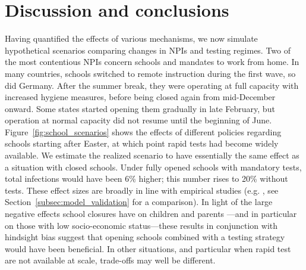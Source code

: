 \section{Discussion and conclusions}

Having quantified the effects of various mechanisms, we now simulate hypothetical
scenarios comparing changes in NPIs and testing regimes. Two of the most contentious
NPIs concern schools and mandates to work from home.\label{ref.2.a} In many countries,
schools switched to remote instruction during the first wave, so did Germany. After the
summer break, they were operating at full capacity with increased hygiene measures,
before being closed again from mid-December onward. Some states started opening them
gradually in late February, but operation at normal capacity did not resume until the
beginning of June. Figure~\ref{fig:school_scenarios} shows the effects of different
policies regarding schools starting after Easter, at which point rapid tests had become
widely available. We estimate the realized scenario to have essentially the same effect
as a situation with closed schools. Under fully opened schools with mandatory tests,
total infections would have been 6\% higher; this number rises to 20\% without tests.
These effect sizes are broadly in line with empirical studies (e.g. \citet{Vlachos2021,
    Berger2021}, see Section~\ref{subsec:model_validation} for a comparison). In light of
the large negative effects school closures have on children and parents
\citep{Luijten2021, Melegari2021}---and in particular on those with low socio-economic
status---these results in conjunction with hindsight bias suggest that opening schools
combined with a testing strategy would have been beneficial. In other situations, and
particular when rapid test are not available at scale, trade-offs may well be different.

